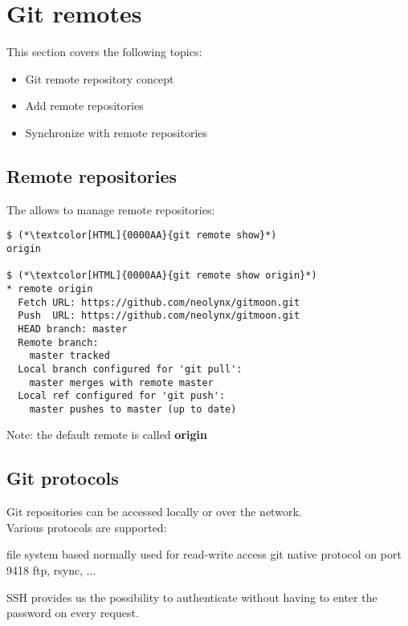 \section{Git remotes}
\begin{frame}[fragile]
  \slidetitle
  This section covers the following topics:
  \begin{itemize}
    \item Git remote repository concept
    \item Add remote repositories
    \item Synchronize with remote repositories
  \end{itemize}
\end{frame}

\subsection{Remote repositories}
\begin{frame}[fragile]
  \subslidetitle
  The  allows to manage remote repositories:
  \begin{lstlisting}
$ (*\textcolor[HTML]{0000AA}{git remote show}*)
origin

$ (*\textcolor[HTML]{0000AA}{git remote show origin}*)
* remote origin
  Fetch URL: https://github.com/neolynx/gitmoon.git
  Push  URL: https://github.com/neolynx/gitmoon.git
  HEAD branch: master
  Remote branch:
    master tracked
  Local branch configured for 'git pull':
    master merges with remote master
  Local ref configured for 'git push':
    master pushes to master (up to date)
\end{lstlisting}
  \vspace{1em}
  Note: the default remote is called \textbf{origin}
\end{frame}

\subsection{Git protocols}
\begin{frame}[fragile]
  \subslidetitle
  Git repositories can be accessed locally or over the network.
  \\
  \vspace{1em}
  Various protocols are supported:
  \begin{itemize}
    {file system based}
      {normally used for read-write access}
      {git native protocol on port 9418}
   {ftp, rsync, ...}
  \end{itemize}
  \vspace{1em}
  SSH provides us the possibility to authenticate without having to enter the password on every request.
\end{frame}

